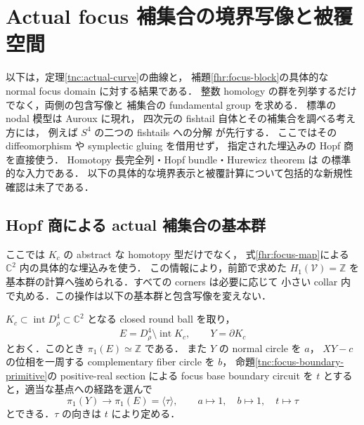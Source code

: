 \section{Actual focus 補集合の境界写像と被覆空間}
\label{tnc:exterior-topology}

以下は，定理\ref{tnc:actual-curve}の曲線と，
補題\ref{fhr:focus-block}の具体的な normal focus domain に対する結果である．
整数 homology の群を列挙するだけでなく，両側の包含写像と
補集合の fundamental group を求める．
標準の nodal 模型は Auroux \cite[Section~5.1]{auroux-local} に現れ，
四次元の fishtail 自体とその補集合を調べる考え方には，
例えば $S^4$ の二つの fishtails への分解
\cite[Introduction and Figure~1]{akbulut-double-fishtail}が先行する．
ここではその diffeomorphism や symplectic gluing を借用せず，
指定された埋込みの Hopf 商を直接使う．
Homotopy 長完全列・Hopf bundle・Hurewicz theorem は
\cite[Theorems~4.32 and 4.41, Example~4.45]{hatcher-bct}の標準的な入力である．
以下の具体的な境界表示と被覆計算について包括的な新規性確認は未了である．

\subsection{Hopf 商による actual 補集合の基本群}
\label{tnc:focus-complement-pi1-section}

ここでは $K_c$ の abstract な homotopy 型だけでなく，
式\eqref{fhr:focus-map}による $\mathbb C^2$ 内の具体的な埋込みを使う．
この情報により，前節で求めた $H_1(\mathcal V)=\mathbb Z$ を
基本群の計算へ強められる．すべての corners は必要に応じて
小さい collar 内で丸める．この操作は以下の基本群と包含写像を変えない．

\begin{lemma}
\label{tnc:focus-exterior-hopf}
$K_c\subset\operatorname{int}D^4_\rho\subset\mathbb C^2$ となる
closed round ball を取り，
\[
 E=D^4_\rho\setminus\operatorname{int}K_c,
 \qquad Y=\partial K_c
\]
とおく．このとき $\pi_1(E)\simeq\mathbb Z$ である．
また $Y$ の normal circle を $a$，
$XY-c$ の位相を一周する complementary fiber circle を $b$，
命題\ref{tnc:focus-boundary-primitive}の positive-real section による
focus base boundary circuit を $t$ とすると，適当な基点への経路を選んで
\[
 \pi_1(Y)\longrightarrow\pi_1(E)=\langle\tau\rangle,
 \qquad a\longmapsto1,\quad b\longmapsto1,
 \quad t\longmapsto\tau
\]
とできる．$\tau$ の向きは $t$ により定める．
\end{lemma}

